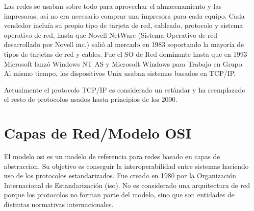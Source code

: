 \documentclass[a4paper, 11pt]{report} %
\begin{document}
Las redes se usaban sobre todo para aprovechar el almacenamiento y las impresoras, así no era necesario comprar una impresora para cada equipo. Cada vendedor incluía su propio tipo de tarjeta de red, cableado, protocolo y sistema operativo de red, hasta que Novell NetWare (Sistema Operativo de red desarrollado por Novell inc.) salió al mercado en 1983 soportando la mayoría de tipos de tarjetas de red y cables. Fue el SO de Red dominante hasta que en 1993 Microsoft lanzó Windows NT AS y Microsoft Windows para Trabajo en Grupo. Al mismo tiempo, los dispositivos Unix usaban sistemas basados en TCP/IP.

Actualmente el protocolo TCP/IP es considerado un estándar y ha reemplazado el resto de protocolos usados hasta principios de los 2000.

\newpage

\section{Capas de Red/Modelo OSI}
El modelo \acrshort{osi} es un modelo de referencia para redes basado en \gls{capas de abstraccion}.
Su objetivo es conseguir la interoperabilidad entre sistemas haciendo uso de los protocolos estandarizados. Fue creado en 1980 por la Organización Internacional de Estandarización (\acrshort{iso}). No es considerado una arquitectura de red porque los protocolos no forman parte del modelo, sino que son entidades de distintas normativas internacionales.
\vspace*{20pt}
\end{document}
